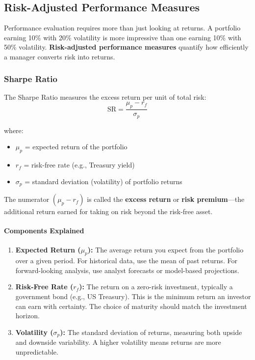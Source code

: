 \subsection{Risk-Adjusted Performance Measures}

Performance evaluation requires more than just looking at returns. A portfolio earning 10\% with 20\% volatility is more impressive than one earning 10\% with 50\% volatility. \textbf{Risk-adjusted performance measures} quantify how efficiently a manager converts risk into returns.

\subsubsection{Sharpe Ratio}

The Sharpe Ratio measures the excess return per unit of total risk:
\begin{equation}
    \text{SR} = \frac{\mu_p - r_f}{\sigma_p}
\end{equation}

where:
\begin{itemize}
    \item $\mu_p$ = expected return of the portfolio
    \item $r_f$ = risk-free rate (e.g., Treasury yield)
    \item $\sigma_p$ = standard deviation (volatility) of portfolio returns
\end{itemize}

The numerator $(\mu_p - r_f)$ is called the \textbf{excess return} or \textbf{risk premium}—the additional return earned for taking on risk beyond the risk-free asset.

\paragraph{Components Explained}
\begin{enumerate}
    \item \textbf{Expected Return ($\mu_p$):} The average return you expect from the portfolio over a given period. For historical data, use the mean of past returns. For forward-looking analysis, use analyst forecasts or model-based projections.
    
    \item \textbf{Risk-Free Rate ($r_f$):} The return on a zero-risk investment, typically a government bond (e.g., US Treasury). This is the minimum return an investor can earn with certainty. The choice of maturity should match the investment horizon.
    
    \item \textbf{Volatility ($\sigma_p$):} The standard deviation of returns, measuring both upside and downside variability. A higher volatility means returns are more unpredictable.
\end{enumerate}


